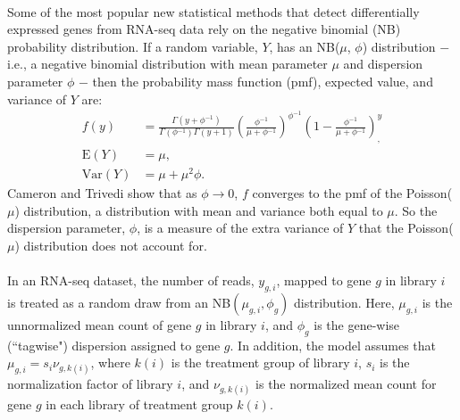 \documentclass[10pt]{article}
\providecommand{\nv}{{}^{-1}}
\providecommand{\rt}{\rightarrow}
\begin{document}
\paragraph{} \indent Some of the most popular new statistical methods that detect differentially expressed %
genes from RNA-seq data rely on the negative binomial (NB) probability distribution. If a random variable, $Y$, has an NB($\mu$, $\phi$) distribution $-$ i.e., a negative binomial distribution with mean parameter $\mu$ and dispersion parameter $\phi$ $-$ then the probability mass function (pmf), expected value, and variance of $Y$ are:
\begin{align*}
f(y) &= \frac{\Gamma(y+ \phi \nv)}{\Gamma(\phi \nv) \Gamma(y + 1)} \left ( \frac{\phi \nv}{\mu + \phi \nv} \right ) ^{\phi \nv} \left ( 1 - \frac{\phi \nv}{\mu + \phi \nv} \right )^ {y}_, \\
\text{E}(Y) &= \mu, \\
\text{Var}(Y) &= \mu + \mu^2 \phi.
\end{align*}
Cameron and Trivedi \cite{travedi} show that as $\phi \rt 0$, $f$ converges to the pmf of the Poisson($\mu$) distribution, a distribution with mean and variance both equal to $\mu$. So the dispersion parameter, $\phi$, is a measure of the extra variance of $Y$ that the Poisson($\mu$) distribution does not account for.

\paragraph{} \indent In an RNA-seq dataset, the number of reads, $y_{g, i}$, mapped to gene $g$ in library $i$ is treated as a random draw from an NB$(\mu_{g, i}, \phi_g)$ distribution. Here, $\mu_{g, i}$ is the unnormalized mean count of gene $g$ in library $i$, and $\phi_g$ is the gene-wise (``tagwise") dispersion assigned to gene $g$. In addition, the model assumes that $\mu_{g, i} = s_i \nu_{g, k(i)}$, where $k(i)$ is the treatment group of library $i$, $s_i$ is the normalization factor of library $i$, and $\nu_{g, k(i)}$ is the normalized mean count for gene $g$ in each library of treatment group $k(i)$.
\end{document}
